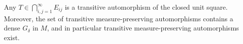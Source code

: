 Any $T \in \bigcap_{i,j=1}^{\infty} E_{ij}$ is a transitive automorphism of the closed unit square. Moreover, the set of transitive measure-preserving automorphisms contains a dense $G_{\delta}$ in $M$, and in particular transitive measure-preserving automorphisms exist.
